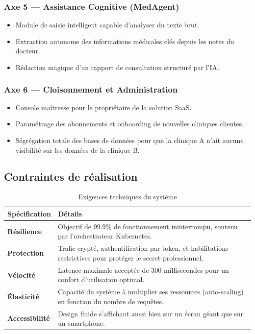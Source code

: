 \documentclass[final]{report}
\begin{document}
\subsubsection*{Axe 5 — Assistance Cognitive (MedAgent)}
\begin{itemize}
  \item Module de saisie intelligent capable d'analyser du texte brut.
  \item Extraction autonome des informations médicales clés depuis les notes du docteur.
  \item Rédaction magique d'un rapport de consultation structuré par l'IA.
\end{itemize}
 
\subsubsection*{Axe 6 — Cloisonnement et Administration}
\begin{itemize}
  \item Console maîtresse pour le propriétaire de la solution SaaS.
  \item Paramétrage des abonnements et onboarding de nouvelles cliniques clientes.
  \item Ségrégation totale des bases de données pour que la clinique A n'ait aucune visibilité sur les données de la clinique B.
\end{itemize}
 
\subsection{Contraintes de réalisation}
\begin{table}[H]
\centering
\caption{Exigences techniques du système}
\renewcommand{\arraystretch}{1.4}
\begin{tabularx}{\textwidth}{|>{\bfseries}p{3.5cm}|X|}
\hline
\textbf{Spécification} & \textbf{Détails} \\
\hline
Résilience & Objectif de 99.9\% de fonctionnement ininterrompu, soutenu par l'orchestrateur Kubernetes. \\
\hline
Protection & Trafic crypté, authentification par token, et habilitations restrictives pour protéger le secret professionnel. \\
\hline
Vélocité & Latence maximale acceptée de 300 millisecondes pour un confort d'utilisation optimal. \\
\hline
Élasticité & Capacité du système à multiplier ses ressources (auto-scaling) en fonction du nombre de requêtes. \\
\hline
Accessibilité & Design fluide s'affichant aussi bien sur un écran géant que sur un smartphone. \\
\hline
\end{tabularx}
\end{table}
 
\end{document}
